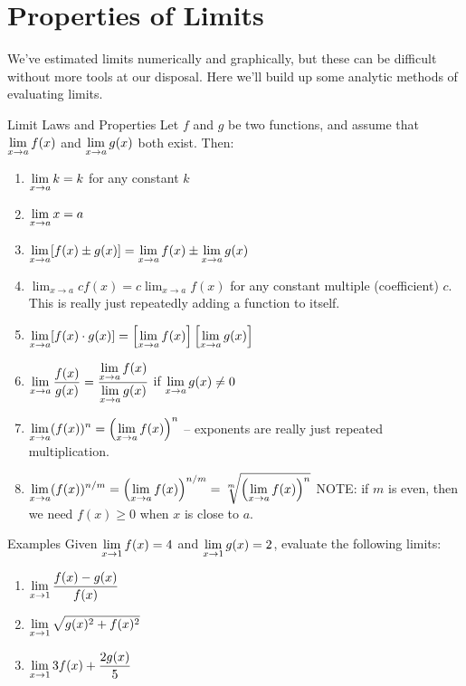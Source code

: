 \section{Properties of Limits}

We've estimated limits numerically and graphically, but these can be difficult without more tools at our disposal.
Here we'll build up some analytic methods of evaluating limits.

\begin{thm}{Limit Laws and Properties}
  Let $f$ and $g$ be two functions, and assume that $\displaystyle \lim_{x\to a} f(x)$ and $\displaystyle \lim_{x\to a} g(x)$ both exist.
  Then:
  \begin{enumerate}
    \item $\displaystyle \lim_{x\to a} k = k$ for any constant $k$
    \item $\displaystyle \lim_{x\to a} x = a$
    \item $\displaystyle \lim_{x\to a} [f(x)\pm g(x)] = \lim_{x\to a} f(x) \pm \lim_{x\to a} g(x)$
    \item $\displaystyle\lim_{x\to a} cf(x) = c\lim_{x\to a} f(x)$ for any constant multiple (coefficient) $c$.
    This is really just repeatedly adding a function to itself.
    \item $\displaystyle \lim_{x\to a} [f(x)\cdot g(x)] = \left[\lim_{x\to a} f(x)\right] \left[\lim_{x\to a} g(x)\right]$
    \item $\displaystyle \lim_{x\to a} \frac{f(x)}{g(x)} = \frac{\displaystyle \lim_{x\to a} f(x)}{\displaystyle \lim_{x\to a} g(x)}$ if $\displaystyle \lim_{x\to a} g(x)\neq0$
    \item $\displaystyle \lim_{x\to a} (f(x))^n = \left(\displaystyle \lim_{x\to a} f(x) \right)^n$ -- exponents are really just repeated multiplication.
    \item $\displaystyle \lim_{x\to a} (f(x))^{n/m} = \left(\lim_{x\to a} f(x)\right)^{n/m} = \sqrt[m]{\left(\lim_{x\to a}f(x)\right)^n}$
    NOTE: if $m$ is even, then we need $f(x)\geq 0$ when $x$ is close to $a$.
  \end{enumerate}
\end{thm}

\begin{note}{Examples}
  Given $\displaystyle \lim_{x\to 1} f(x) = 4$ and $\displaystyle \lim_{x\to 1} g(x) = 2$, evaluate the following limits:
  \begin{enumerate}
    \item $\displaystyle \lim_{x\to 1}\dfrac{f(x)-g(x)}{f(x)}$
    \item $\displaystyle \lim_{x\to 1} \sqrt{g(x)^2+f(x)^2}$
    \item $\displaystyle \lim_{x\to 1} 3f(x)+\dfrac{2g(x)}{5}$
  \end{enumerate}
\end{note}
